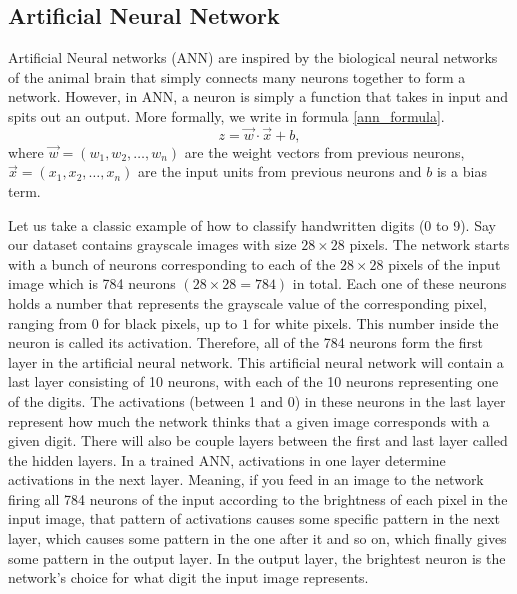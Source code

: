 \documentclass[master]{thesis-uestc}
\begin{document}
\subsection*{Artificial Neural Network}
Artificial Neural networks (ANN) are inspired by the biological neural networks of the animal brain that simply connects many neurons together to form a network. However, in ANN, a neuron is simply a function that takes in input and spits out an output. More formally, we write in formula \ref{ann_formula}. 
\begin{equation}
    z = \vec{w} \cdot \vec{x} + b,
\label{ann_formula}
\end{equation}
where $\vec{w} = (w_1, w_2, \dots, w_n)$ are the weight vectors from previous neurons, $\vec{x} = (x_1, x_2, \dots, x_n)$ are the input units from previous neurons and $b$ is a bias term.

Let us take a classic example of how to classify handwritten digits (0 to 9). Say our dataset contains grayscale images with size $28 \times 28$ pixels. The network starts with a bunch of neurons corresponding to each of the $28 \times 28$ pixels of the input image which is 784 neurons $(28 \times 28 = 784)$ in total. Each one of these neurons holds a number that represents the grayscale value of the corresponding pixel, ranging from $0$ for black pixels, up to $1$ for white pixels. This number inside the neuron is called its activation. Therefore, all of the 784 neurons form the first layer in the artificial neural network. This artificial neural network will contain a last layer consisting of 10 neurons, with each of the 10 neurons representing one of the digits. The activations (between 1 and 0) in these neurons in the last layer represent how much the network thinks that a given image corresponds with a given digit. There will also be couple layers between the first and last layer called the hidden layers. In a trained ANN, activations in one layer determine activations in the next layer. Meaning, if you feed in an image to the network firing all 784 neurons of the input according to the brightness of each pixel in the input image, that pattern of activations causes some specific pattern in the next layer, which causes some pattern in the one after it and so on, which finally gives some pattern in the output layer. In the output layer, the brightest neuron is the network's choice for what digit the input image represents.
\end{document}
